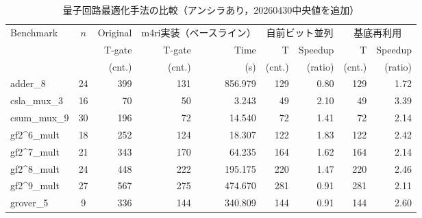 
\begin{table}[htbp]
\centering
\caption{量子回路最適化手法の比較（アンシラあり，20260430中央値を追加）}
\label{tab:quantum_opt_results_3methods_20260430_added}
\footnotesize
\setlength{\tabcolsep}{4pt}
\renewcommand{\arraystretch}{1.3}
\begin{tabular}{l c r | r r | r r | r r}
\toprule
\multirow{3}{*}{Benchmark} & \multirow{3}{*}{$n$} & \multicolumn{1}{c|}{Original} & \multicolumn{2}{c|}{m4ri実装（ベースライン）} & \multicolumn{2}{c|}{自前ビット並列} & \multicolumn{2}{c}{基底再利用} \\
\cmidrule(lr){3-3} \cmidrule(lr){4-5} \cmidrule(lr){6-7} \cmidrule(lr){8-9}
 & & {T-gate} & {T-gate} & {Time} & {T} & {Speedup} & {T} & {Speedup} \\
 & & {(cnt.)} & {(cnt.)} & {(s)} & {(cnt.)} & {(ratio)} & {(cnt.)} & {(ratio)} \\
\midrule
adder\_8 & 24 & 399 & 131 & 856.979 & \cellcolor{bestT}129 & 0.80 & \cellcolor{bestT}129 & \cellcolor{bestSpeed}1.72 \\
csla\_mux\_3 & 16 & 70 & 50 & 3.243 & \cellcolor{bestT}49 & 2.10 & \cellcolor{bestT}49 & \cellcolor{bestSpeed}3.39 \\
csum\_mux\_9 & 30 & 196 & \cellcolor{bestT}72 & 14.540 & \cellcolor{bestT}72 & 1.41 & \cellcolor{bestT}72 & \cellcolor{bestSpeed}2.14 \\
gf2\textasciicircum6\_mult & 18 & 252 & 124 & 18.307 & \cellcolor{bestT}122 & 1.83 & \cellcolor{bestT}122 & \cellcolor{bestSpeed}2.42 \\
gf2\textasciicircum7\_mult & 21 & 343 & 170 & 64.235 & \cellcolor{bestT}164 & 1.62 & \cellcolor{bestT}164 & \cellcolor{bestSpeed}2.14 \\
gf2\textasciicircum8\_mult & 24 & 448 & 222 & 195.175 & \cellcolor{bestT}220 & 1.47 & \cellcolor{bestT}220 & \cellcolor{bestSpeed}2.46 \\
gf2\textasciicircum9\_mult & 27 & 567 & \cellcolor{bestT}275 & 474.670 & 281 & 0.91 & 281 & \cellcolor{bestSpeed}2.11 \\
grover\_5 & 9 & 336 & \cellcolor{bestT}144 & 340.809 & \cellcolor{bestT}144 & 0.91 & \cellcolor{bestT}144 & \cellcolor{bestSpeed}2.60 \\

\end{tabular}
\end{table}
